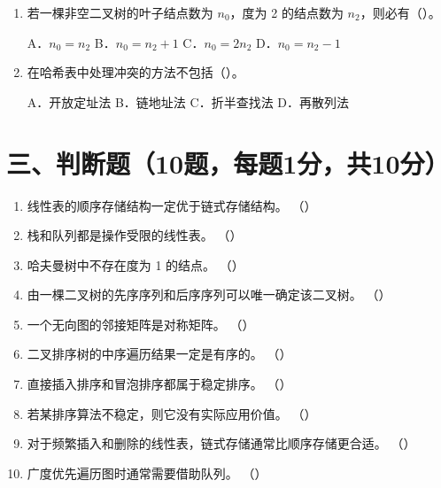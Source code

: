 \documentclass{../../note}
\begin{document}
\begin{enumerate}[itemsep=0.8em]
A．快速排序 \quad B．简单选择排序 \quad C．归并排序 \quad D．堆排序

\item 若一棵非空二叉树的叶子结点数为 $n_0$，度为 2 的结点数为 $n_2$，则必有（\hspace{0.8cm}）。

A．$n_0=n_2$ \quad B．$n_0=n_2+1$ \quad C．$n_0=2n_2$ \quad D．$n_0=n_2-1$

\item 在哈希表中处理冲突的方法不包括（\hspace{0.8cm}）。

A．开放定址法 \quad B．链地址法 \quad C．折半查找法 \quad D．再散列法
\end{enumerate}

\section*{三、判断题（10题，每题1分，共10分）}

\begin{enumerate}[itemsep=0.6em]
\item 线性表的顺序存储结构一定优于链式存储结构。 （\hspace{0.8cm}）
\item 栈和队列都是操作受限的线性表。 （\hspace{0.8cm}）
\item 哈夫曼树中不存在度为 1 的结点。 （\hspace{0.8cm}）
\item 由一棵二叉树的先序序列和后序序列可以唯一确定该二叉树。 （\hspace{0.8cm}）
\item 一个无向图的邻接矩阵是对称矩阵。 （\hspace{0.8cm}）
\item 二叉排序树的中序遍历结果一定是有序的。 （\hspace{0.8cm}）
\item 直接插入排序和冒泡排序都属于稳定排序。 （\hspace{0.8cm}）
\item 若某排序算法不稳定，则它没有实际应用价值。 （\hspace{0.8cm}）
\item 对于频繁插入和删除的线性表，链式存储通常比顺序存储更合适。 （\hspace{0.8cm}）
\item 广度优先遍历图时通常需要借助队列。 （\hspace{0.8cm}）
\end{enumerate}
\end{document}
